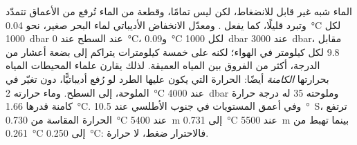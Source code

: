 الماء شبه غير قابل للانضغاط، لكن ليس تمامًا، وقطعة من الماء تُرفع من الأعماق تتمدّد وتبرد قليلًا، كما يفعل . ومعدّل الانخفاض الأديباتي لماء البحر صغير، نحو \qty{0.04}{\celsius} لكل \qty{1000}{dbar} عند السطح عند \qty{0}{\celsius}، و\qty{0.09}{\celsius} لكل \qty{1000}{dbar} عند \qty{3000}{dbar}، مقابل \num{9.8} لكل كيلومتر في الهواء؛ لكنه على خمسة كيلومترات يتراكم إلى بضعة أعشار من الدرجة، أكثر من الفروق بين المياه العميقة. لذلك يقارن علماء المحيطات المياه بحرارتها \emph{الكامنة} أيضًا: الحرارة التي يكون عليها الطرد لو رُفع أديباتيًّا، دون تغيّر في الملوحة، إلى السطح. وماء حرارته \qty{2}{\celsius} عند \qty{4000}{dbar} وملوحته 35 له درجة حرارة كامنة قدرها \qty{1.66}{\celsius}. وفي أعمق المستويات في جنوب الأطلسي عند \qty{10.5}{\degree S}، ترتفع الحرارة المقاسة من \qty{0.730}{\celsius} عند \qty{5400}{m} إلى \qty{0.731}{\celsius} عند \qty{5500}{m} بينما تهبط  من \qty{0.261}{\celsius} إلى \qty{0.250}{\celsius}: فالاحترار ضغط، لا حرارة.

